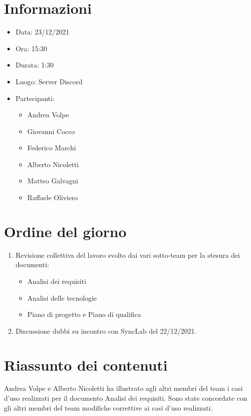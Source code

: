 \documentclass[a4paper, 12pt]{article}
\begin{document}
\makefrontpage

\section{Informazioni}

\begin{itemize}
\item Data: 23/12/2021
\item Ora: 15:30
\item Durata: 1:30
\item Luogo: Server Discord
\item Partecipanti: 
\begin{itemize}
\item Andrea Volpe
\item Giovanni Cocco
\item Federico Marchi
\item Alberto Nicoletti
\item Matteo Galvagni
\item Raffaele Oliviero
\end{itemize}
\end{itemize}

\section{Ordine del giorno}
\begin{enumerate}
\item Revisione collettiva del lavoro svolto dai vari sotto-team per la stesura dei documenti:
\begin{itemize}
\item Analisi dei requisiti
\item Analisi delle tecnologie
\item Piano di progetto e Piano di qualifica
\end{itemize}
\item Discussione dubbi su incontro con SyncLab del 22/12/2021.
\end{enumerate}

\section{Riassunto dei contenuti}
Andrea Volpe e Alberto Nicoletti ha illustrato agli altri membri del team i casi d'uso realizzati per il documento Analisi dei requisiti.
Sono state concordate con gli altri membri del team modifiche correttive ai casi d'uso realizzati.
\end{document}
